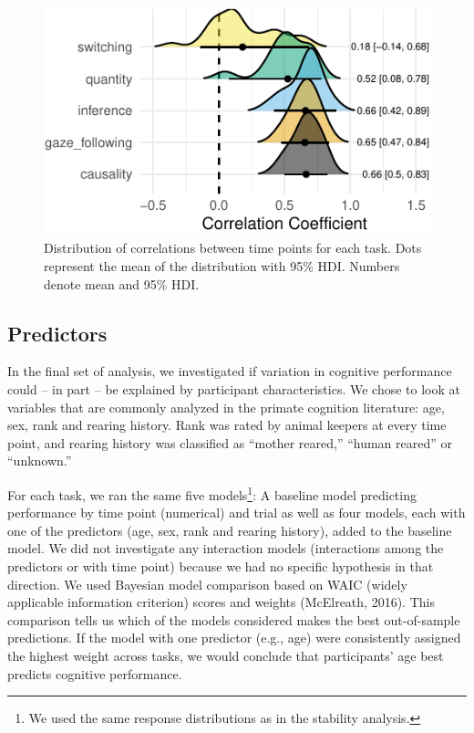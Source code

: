 \documentclass[10pt, letterpaper]{article}
\newenvironment{CodeChunk}{}{}
\begin{document}
\begin{CodeChunk}
\begin{figure}[H]

{\centering \includegraphics{figs/relplot-1} 

}

\caption[Distribution of correlations between time points for each task]{Distribution of correlations between time points for each task. Dots represent the mean of the distribution with 95\% HDI. Numbers denote mean and 95\% HDI.}\label{fig:relplot}
\end{figure}
\end{CodeChunk}

\hypertarget{predictors}{%
\subsection{Predictors}\label{predictors}}

In the final set of analysis, we investigated if variation in cognitive
performance could -- in part -- be explained by participant
characteristics. We chose to look at variables that are commonly
analyzed in the primate cognition literature: age, sex, rank and rearing
history. Rank was rated by animal keepers at every time point, and
rearing history was classified as ``mother reared,'' ``human reared'' or
``unknown.''

For each task, we ran the same five models\footnote{We used the same
  response distributions as in the stability analysis.}: A baseline
model predicting performance by time point (numerical) and trial as well
as four models, each with one of the predictors (age, sex, rank and
rearing history), added to the baseline model. We did not investigate
any interaction models (interactions among the predictors or with time
point) because we had no specific hypothesis in that direction. We used
Bayesian model comparison based on WAIC (widely applicable information
criterion) scores and weights (McElreath, 2016). This comparison tells
us which of the models considered makes the best out-of-sample
predictions. If the model with one predictor (e.g., age) were
consistently assigned the highest weight across tasks, we would conclude
that participants' age best predicts cognitive performance.
\end{document}
